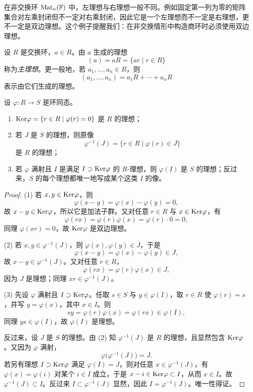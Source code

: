 \begin{example}
在非交换环 $\mathrm{Mat}_n(\mathbb{F})$ 中，左理想与右理想一般不同。例如固定第一列为零的矩阵集合对左乘封闭但不一定对右乘封闭，因此它是一个左理想而不一定是右理想，更不一定是双边理想。这个例子提醒我们：在非交换情形中构造商环时必须使用双边理想。
\end{example}

\begin{definition}
设 $R$ 是交换环，$a\in R$。由 $a$ 生成的理想
\[
(a)=aR=\{ar\mid r\in R\}
\]
称为\emph{主理想}。更一般地，若 $a_1,\dots,a_n\in R$，则
\[
(a_1,\dots,a_n)=a_1R+\cdots+a_nR
\]
表示由它们生成的理想。
\end{definition}

\begin{proposition}
设 $\varphi:R\to S$ 是环同态。
\begin{enumerate}[label=\textnormal{(\arabic*)}]
  \item $\mathrm{Ker}\varphi=\{r\in R\mid \varphi(r)=0\}$ 是 $R$ 的理想；
  \item 若 $J$ 是 $S$ 的理想，则原像
  \[
  \varphi^{-1}(J)=\{r\in R\mid \varphi(r)\in J\}
  \]
  是 $R$ 的理想；
  \item 若 $\varphi$ 满射且 $I$ 是满足 $I\supset \mathrm{Ker}\varphi$ 的 $R$-理想，则 $\varphi(I)$ 是 $S$ 的理想；反过来，$S$ 的每个理想都唯一地写成某个这类 $I$ 的像。
\end{enumerate}
\end{proposition}

\begin{proof}
(1) 若 $x,y\in\mathrm{Ker}\varphi$，则
\[
\varphi(x-y)=\varphi(x)-\varphi(y)=0,
\]
故 $x-y\in\mathrm{Ker}\varphi$，所以它是加法子群。又对任意 $r\in R$ 与 $x\in\mathrm{Ker}\varphi$，有
\[
\varphi(rx)=\varphi(r)\varphi(x)=\varphi(r)\cdot 0=0,
\]
同理 $\varphi(xr)=0$，故 $\mathrm{Ker}\varphi$ 是双边理想。

(2) 若 $x,y\in\varphi^{-1}(J)$，则 $\varphi(x),\varphi(y)\in J$，于是
\[
\varphi(x-y)=\varphi(x)-\varphi(y)\in J,
\]
故 $x-y\in\varphi^{-1}(J)$。又对任意 $r\in R$，
\[
\varphi(rx)=\varphi(r)\varphi(x)\in J,
\]
因为 $J$ 是理想；同理 $xr\in\varphi^{-1}(J)$。

(3) 先设 $\varphi$ 满射且 $I\supset\mathrm{Ker}\varphi$。任取 $s\in S$ 与 $y\in\varphi(I)$，取 $r\in R$ 使 $\varphi(r)=s$，并写 $y=\varphi(x)$，其中 $x\in I$。则
\[
sy=\varphi(r)\varphi(x)=\varphi(rx)\in\varphi(I),
\]
同理 $ys\in\varphi(I)$，故 $\varphi(I)$ 是理想。

反过来，设 $J$ 是 $S$ 的理想。由 (2) 知 $\varphi^{-1}(J)$ 是 $R$ 的理想，且显然包含 $\mathrm{Ker}\varphi$。又因为 $\varphi$ 满射，
\[
\varphi\bigl(\varphi^{-1}(J)\bigr)=J.
\]
若另有理想 $I\supset\mathrm{Ker}\varphi$ 满足 $\varphi(I)=J$，则对任意 $x\in\varphi^{-1}(J)$，有 $\varphi(x)=\varphi(i)$ 对某个 $i\in I$ 成立，于是 $x-i\in\mathrm{Ker}\varphi\subset I$，从而 $x\in I$。故 $\varphi^{-1}(J)\subset I$。反过来 $I\subset\varphi^{-1}(J)$ 显然，因此 $I=\varphi^{-1}(J)$。唯一性得证。
\end{proof}

